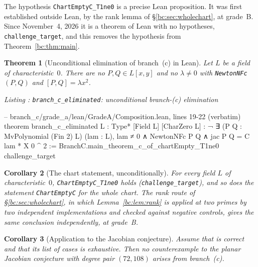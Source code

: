 \documentclass[a4paper,11pt]{article}
\newcounter{leanlisting}
\newenvironment{leanlisting}[2]{%
  \refstepcounter{leanlisting}\label{#2}%
  \begin{center}\textit{\small\color{inksecondary}Listing \theleanlisting: #1}\end{center}%
  \Verbatim[breaklines=true,breakanywhere=true,fontsize=\footnotesize,frame=single,framesep=4pt,rulecolor=\color{borderstrong},fillcolor=\color{bgsubtle}]%
}{%
  \endVerbatim%
}
\theoremstyle{jsplain}
\newtheorem{theorem}{Theorem}[section]
\newtheorem{corollary}[theorem]{Corollary}
\theoremstyle{jsdef}
\theoremstyle{jsrem}
\begin{document}
The hypothesis \texttt{ChartEmptyC\_\allowbreak{}T1ne0} is a precise Lean proposition. It was first established outside Lean, by the rank lemma of \S\ref{bc:sec:wholechart}, at grade~B. Since November~4, 2026 it is a theorem of Lean with no hypotheses, \texttt{challenge\_\allowbreak{}target}, and this removes the hypothesis from Theorem~\ref{bc:thm:main}.

\begin{theorem}[Unconditional elimination of branch~(c) in Lean]\label{bc:thm:unconditional}
Let $L$ be a field of characteristic~$0$. There are no $P,Q\in L[x,y]$ and no $\lambda\neq0$ with \texttt{NewtonNFc}$(P,Q)$ and $[P,Q]=\lambda x^2$.
\end{theorem}

\begin{leanlisting}{\texttt{branch\_c\_eliminated}: unconditional branch-(c) elimination}{bc:lst:unconditional}
-- branch_c/grade_a/lean/GradeA/Composition.lean, lines 19-22 (verbatim)
theorem branch_c_eliminated {L : Type*} [Field L] [CharZero L] :
    ¬ ∃ (P Q : MvPolynomial (Fin 2) L) (lam : L), lam ≠ 0 ∧ NewtonNFc P Q ∧
      jac P Q = C lam * X 0 ^ 2 :=
  BranchC.main_theorem_c_of_chartEmpty_T1ne0 challenge_target
\end{leanlisting}

\begin{corollary}[The chart statement, unconditionally]\label{bc:cor:unconditional}
For every field $L$ of characteristic~$0$, \texttt{ChartEmptyC\_\allowbreak{}T1ne0} holds (\texttt{challenge\_\allowbreak{}target}), and so does the statement \texttt{ChartEmptyC} for the whole chart. The rank route of \S\ref{bc:sec:wholechart}, in which Lemma~\ref{bc:lem:rank} is applied at two primes by two independent implementations and checked against negative controls, gives the same conclusion independently, at grade~B.
\end{corollary}

\begin{corollary}[Application to the Jacobian conjecture]\label{bc:cor:gghv}
Assume that \cite[Prop.~4.3]{GGHV} is correct and that its list of cases is exhaustive. Then no counterexample to the planar Jacobian conjecture with degree pair $(72,108)$ arises from branch~(c).
\end{corollary}
\end{document}

